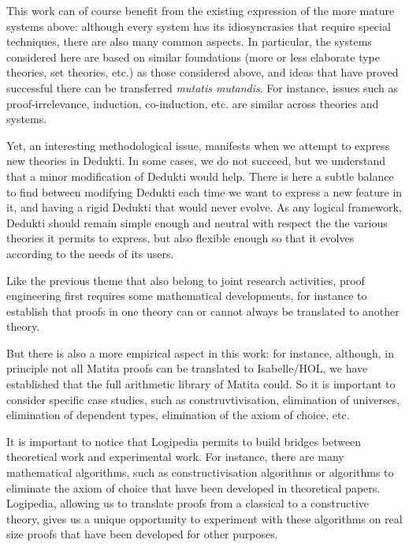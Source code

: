 This work can of course benefit from the existing expression of the
more mature systems above: although every system has its
idiosyncrasies that require special techniques, there are also many
common aspects. In particular, the systems considered here are based
on similar foundations (more or less elaborate type theories, set
theories, etc.) as those considered above, and ideas that have proved
successful there can be transferred {\em mutatis mutandis}. For
instance, issues such as proof-irrelevance, induction, co-induction,
etc. are similar across theories and systems.

Yet, an interesting methodological issue, manifests when we attempt to
express new theories in Dedukti. In some cases, we do not succeed, but
we understand that a minor modification of Dedukti would help. There
is here a subtle balance to find between modifying Dedukti each time
we want to express a new feature in it, and having a rigid Dedukti
that would never evolve. As any logical framework, Dedukti should
remain simple enough and neutral with respect the the various theories
it permits to express, but also flexible enough so that it evolves
according to the needs of its users.


Like the previous theme that also belong to joint research activities,
proof engineering first requires some mathematical developments, for
instance to establish that proofs in one theory can or cannot always
be translated to another theory.

But there is also a more empirical aspect in this work: for instance,
although, in principle not all Matita proofs can be translated to
Isabelle/HOL, we have established that the full arithmetic library of
Matita could. So it is important to consider specific case studies,
such as construvtivisation, elimination of universes, elimination of
dependent types, elimination of the axiom of choice, etc.

It is important to notice that Logipedia permits to build bridges
between theoretical work and experimental work. For instance, there
are many mathematical algorithms, such as constructivisation
algorithms or algorithms to eliminate the axiom of choice that have
been developed in theoretical papers. Logipedia, allowing us to
translate proofs from a classical to a constructive theory, gives us a
unique opportunity to experiment with these algorithms on real size
proofs that have been developed for other purposes.

